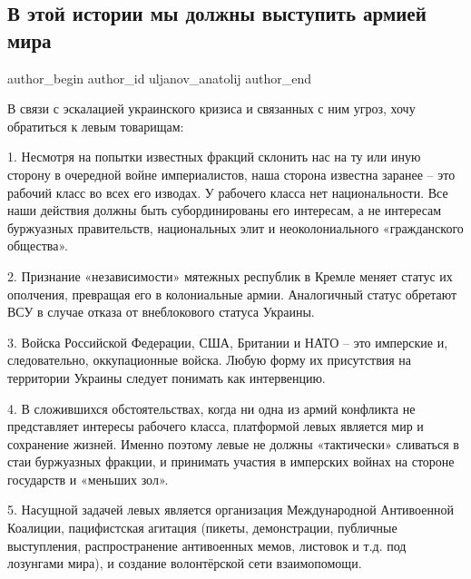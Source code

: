  
 
 
 
 
 
\subsection{В этой истории мы должны выступить армией мира}
\label{sec:22_02_2022.fb.uljanov_anatolij.1.armia_mira}
 
\ifcmt
 author_begin
   author_id uljanov_anatolij
 author_end
\fi

В связи с эскалацией украинского кризиса и связанных с ним угроз, хочу
обратиться к левым товарищам: 

1. Несмотря на попытки известных фракций склонить нас на ту или иную сторону в
очередной войне империалистов, наша сторона известна заранее – это рабочий
класс во всех его изводах. У рабочего класса нет национальности. Все наши
действия должны быть субординированы его интересам, а не интересам буржуазных
правительств, национальных элит и неоколониального «гражданского общества». 


2. Признание «независимости» мятежных республик в Кремле меняет статус их
ополчения, превращая его в колониальные армии. Аналогичный статус обретают ВСУ
в случае отказа от внеблокового статуса Украины.

3. Войска Российской Федерации, США, Британии и НАТО – это имперские и,
следовательно, оккупационные войска. Любую форму их присутствия на территории
Украины следует понимать как интервенцию.

4. В сложившихся обстоятельствах, когда ни одна из армий конфликта не
представляет интересы рабочего класса, платформой левых является мир и
сохранение жизней. Именно поэтому левые не должны «тактически» сливаться в стаи
буржуазных фракции, и принимать участия в имперских войнах на стороне
государств и «меньших зол». 

5. Насущной задачей левых является организация Международной Антивоенной
Коалиции, пацифистская агитация (пикеты, демонстрации, публичные выступления,
распространение антивоенных мемов, листовок и т.д. под лозунгами мира), и
создание волонтёрской сети взаимопомощи.

